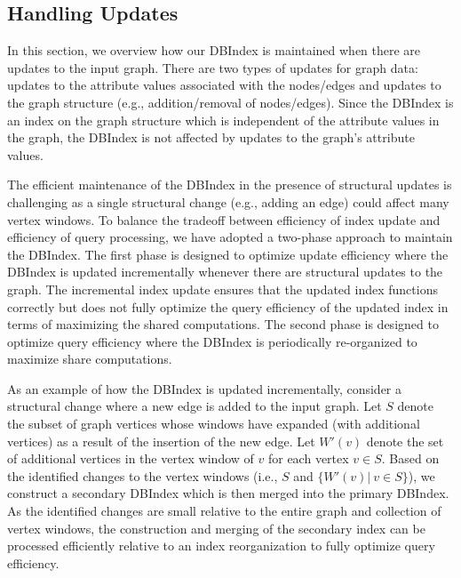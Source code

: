 \subsection{Handling Updates}

In this section, we overview how our DBIndex is maintained when there are updates to the input graph.
There are two types of updates for graph data: updates to the attribute values associated with the nodes/edges and updates to the graph structure 
(e.g., addition/removal of nodes/edges).
Since the DBIndex is an index on the graph structure which is independent of the attribute values in the graph,
the DBIndex is not affected by updates to the graph's attribute values.

The efficient maintenance of the DBIndex in the presence of structural updates is challenging as a single structural change (e.g., adding an edge) could affect many vertex windows.  To balance the tradeoff between efficiency of index update and efficiency of query processing, 
we have adopted a two-phase approach to maintain the DBIndex.
The first phase is designed to optimize update efficiency where the DBIndex is updated incrementally whenever there are structural updates to the graph.
The incremental index update ensures that the updated index functions correctly but does not fully optimize the query efficiency of the updated index
in terms of maximizing the shared computations.
The second phase is designed to optimize query efficiency where the DBIndex is periodically re-organized to maximize share computations.

As an example of how the DBIndex is updated incrementally, consider a structural change where a new edge is added to the input graph.
Let $S$ denote the subset of graph vertices whose windows have expanded (with additional vertices) as a result of the insertion of the new edge.
Let $W'(v)$ denote the set of additional vertices in the vertex window of $v$ for each vertex $v \in S$.
Based on the identified changes to the vertex windows (i.e., $S$ and $\{W'(v) |\ v \in S\}$), 
we construct a secondary DBIndex which is then merged into the primary DBIndex.
As the identified changes are small relative to the entire graph and collection of vertex windows,
the construction and merging of the secondary index can be processed efficiently relative to an index reorganization to fully optimize query efficiency.






